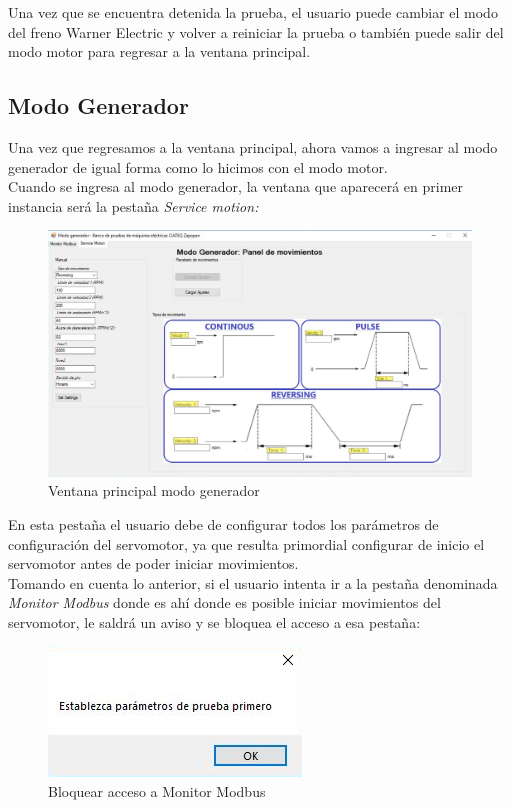 \documentclass[12pt,titlepage]{article}
\begin{document}
Una vez que se encuentra detenida la prueba, el usuario puede cambiar el modo del freno Warner Electric y volver a reiniciar la prueba o también puede salir del modo motor para regresar a la ventana principal. \\
\newpage
\subsection{Modo Generador}

Una vez que regresamos  a la ventana principal, ahora vamos a ingresar al modo generador de igual forma como lo hicimos con el modo motor. \\ 


Cuando se ingresa al modo generador, la ventana que aparecerá en primer instancia será la pestaña \textit{Service motion: }\\ 

\begin{figure}[htbp]
\hspace*{0.8cm} 
\includegraphics[scale=0.51]{First_screen_gen_mode}
\caption{Ventana principal modo generador}
\end{figure}

En esta pestaña el usuario debe de configurar todos los parámetros de configuración del servomotor, ya que resulta  primordial  configurar de inicio  el servomotor antes de poder iniciar movimientos. \\ 

Tomando en cuenta lo anterior, si el usuario intenta ir a la pestaña denominada \textit{Monitor Modbus} donde es ahí donde es posible iniciar movimientos del servomotor, le saldrá un aviso y se bloquea el acceso a esa pestaña: \\ 
\begin{figure}[htbp]
\hspace*{5.8cm} 
\includegraphics[scale=0.78]{no_seet_params}
\caption{Bloquear acceso a Monitor Modbus}
\end{figure}
\newpage
\end{document}
